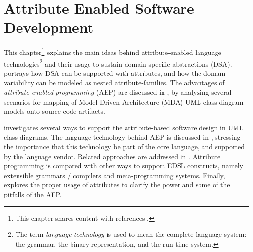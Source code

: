 

\chapter{Attribute Enabled Software Development}
\label{ch:gaast}
\label{ch03}

\noindent This chapter\footnote{This chapter shares content with references \cite{cepa.mezini.gaast.04,cepa.kloppenburg.05}.} explains the main ideas behind attribute-enabled language technologies\footnote{The term \textit{language technology} is used to mean the complete language system: the grammar, the binary representation, and the run-time system.} and their usage to sustain domain specific abstractions (DSA).  portrays how DSA can be supported with attributes, and how the domain variability can be modeled as nested attribute-families. The advantages of \textit{attribute enabled programming} (AEP) are discussed in , by analyzing several scenarios for mapping of Model-Driven Architecture (MDA) UML class diagram models onto source code artifacts. %

 investigates several ways to support the attribute-based software design in UML class diagrams. The language technology behind AEP is discussed in , stressing the importance that this technology be part of the core language, and supported by the language vendor. Related approaches are addressed in . Attribute programming is compared with other ways to support EDSL constructs, namely extensible grammars / compilers and meta-programming systems. Finally,  explores the proper usage of attributes to clarify the power and some of the pitfalls of the AEP.

\begin{figure}[ht]
\end{figure}

